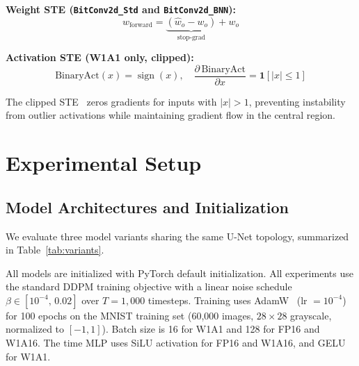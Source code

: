\documentclass[conference]{IEEEtran}
\begin{document}
\textbf{Weight STE (\texttt{BitConv2d\_Std} and \texttt{BitConv2d\_BNN}):}
\begin{equation}
  w_\text{forward} = \underbrace{(\hat{w}_o - w_o)}_{\text{stop-grad}} + w_o
  \label{eq:ste-w}
\end{equation}

\textbf{Activation STE (W1A1 only, clipped):}
\begin{equation}
  \text{BinaryAct}(x) = \operatorname{sign}(x),
  \quad
  \frac{\partial\,\text{BinaryAct}}{\partial x} = \mathbf{1}[|x|\le 1]
  \label{eq:ste-a}
\end{equation}

The clipped STE~\cite{courbariaux2016clippedste} zeros gradients for inputs with
$|x|>1$, preventing instability from outlier activations while maintaining gradient
flow in the central region.

\section{Experimental Setup}

\subsection{Model Architectures and Initialization}

We evaluate three model variants sharing the same U-Net topology, summarized in
Table~\ref{tab:variants}.

\begin{table}[h]
\centering
\caption{Model Variants}
\label{tab:variants}
\footnotesize
{}
\end{table}

All models are initialized with PyTorch default initialization. All experiments use the
standard DDPM training objective with a linear noise schedule $\beta \in
[10^{-4},\,0.02]$ over $T=1{,}000$ timesteps. Training uses
AdamW~\cite{loshchilov2019adamw} (lr $=10^{-4}$) for 100 epochs on the MNIST training
set (60{,}000 images, $28{\times}28$ grayscale, normalized to $[-1,1]$). Batch size is
16 for W1A1 and 128 for FP16 and W1A16. The time MLP uses SiLU activation for FP16 and
W1A16, and GELU for W1A1.
\end{document}
